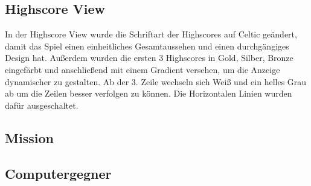\documentclass{article}
\begin{document}
\subsection{Highscore View}
In der Highscore View wurde die Schriftart der Highscores auf Celtic geändert, damit das Spiel einen einheitliches Gesamtaussehen und einen durchgängiges Design hat. Außerdem wurden die ersten 3 Highscores in Gold, Silber, Bronze eingefärbt und anschließend mit einem Gradient versehen, um die Anzeige dynamischer zu gestalten. Ab der 3. Zeile wechseln sich Weiß und ein helles Grau ab um die Zeilen besser verfolgen zu können. Die Horizontalen Linien wurden dafür ausgeschaltet.

\subsection{Mission}

\subsection{Computergegner}
\end{document}
